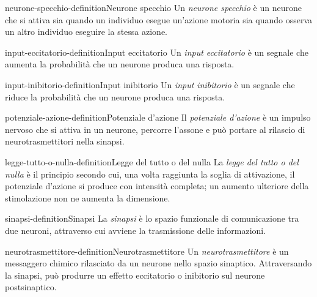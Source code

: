 \documentclass[preview]{standalone}
\begin{document}

\begin{snippetdefinition}{neurone-specchio-definition}{Neurone specchio}
    Un \emph{neurone specchio} è un neurone che si attiva sia quando un
    individuo esegue un'azione motoria sia quando osserva un altro individuo
    eseguire la stessa azione.
\end{snippetdefinition}

\begin{snippetdefinition}{input-eccitatorio-definition}{Input eccitatorio}
    Un \emph{input eccitatorio} è un segnale che aumenta la probabilità che un
    neurone produca una risposta.
\end{snippetdefinition}

\begin{snippetdefinition}{input-inibitorio-definition}{Input inibitorio}
    Un \emph{input inibitorio} è un segnale che riduce la probabilità che un
    neurone produca una risposta.
\end{snippetdefinition}

\begin{snippetdefinition}{potenziale-azione-definition}{Potenziale d'azione}
    Il \emph{potenziale d'azione} è un impulso nervoso che si attiva in un
    neurone, percorre l'assone e può portare al rilascio di neurotrasmettitori
    nella sinapsi.
\end{snippetdefinition}

\begin{snippetdefinition}{legge-tutto-o-nulla-definition}{Legge del tutto o del nulla}
    La \emph{legge del tutto o del nulla} è il principio secondo cui, una volta
    raggiunta la soglia di attivazione, il potenziale d'azione si produce con
    intensità completa; un aumento ulteriore della stimolazione non ne aumenta
    la dimensione.
\end{snippetdefinition}

\begin{snippetdefinition}{sinapsi-definition}{Sinapsi}
    La \emph{sinapsi} è lo spazio funzionale di comunicazione tra due neuroni,
    attraverso cui avviene la trasmissione delle informazioni.
\end{snippetdefinition}

\begin{snippetdefinition}{neurotrasmettitore-definition}{Neurotrasmettitore}
    Un \emph{neurotrasmettitore} è un messaggero chimico rilasciato da un
    neurone nello spazio sinaptico. Attraversando la sinapsi, può produrre un
    effetto eccitatorio o inibitorio sul neurone postsinaptico.
\end{snippetdefinition}
\end{document}

